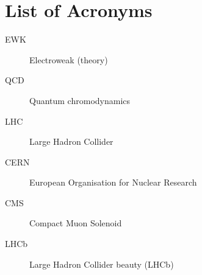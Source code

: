 \chapter{List of Acronyms}

  \begin{description}

    \item[EWK]		\dotfill	Electroweak (theory)
    \item[QCD]		\dotfill	Quantum chromodynamics
    \item[LHC]		\dotfill	Large Hadron Collider
    \item[CERN]		\dotfill	European Organisation for Nuclear Research
    \item[CMS]		\dotfill	Compact Muon Solenoid

    \item[LHCb]   \dotfill  Large Hadron Collider beauty (LHCb) 

  \end{description}
